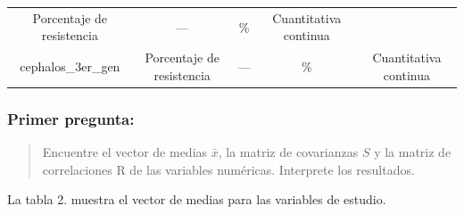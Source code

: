 \documentclass[
]{article}
\begin{document}
\begin{longtable}[]{@{}ccccc@{}}
\begin{minipage}[t]{0.21\columnwidth}
Porcentaje de resistencia\strut
\end{minipage} & \begin{minipage}[t]{0.24\columnwidth}\centering
---\strut
\end{minipage} & \begin{minipage}[t]{0.07\columnwidth}\centering
\%\strut
\end{minipage} & \begin{minipage}[t]{0.18\columnwidth}\centering
Cuantitativa continua\strut
\end{minipage}\tabularnewline
\begin{minipage}[t]{0.16\columnwidth}\centering
cephalos\_3er\_gen\strut
\end{minipage} & \begin{minipage}[t]{0.21\columnwidth}\centering
Porcentaje de resistencia\strut
\end{minipage} & \begin{minipage}[t]{0.24\columnwidth}\centering
---\strut
\end{minipage} & \begin{minipage}[t]{0.07\columnwidth}\centering
\%\strut
\end{minipage} & \begin{minipage}[t]{0.18\columnwidth}\centering
Cuantitativa continua\strut
\end{minipage}\tabularnewline
\bottomrule
\end{longtable}

\hypertarget{primer-pregunta}{%
\subsubsection{Primer pregunta:}\label{primer-pregunta}}

\begin{quote}
Encuentre el vector de medias \(\bar{x}\), la matriz de covarianzas
\(S\) y la matriz de correlaciones R de las variables numéricas.
Interprete los resultados.
\end{quote}

La tabla 2. muestra el vector de medias para las variables de estudio.
\end{document}

